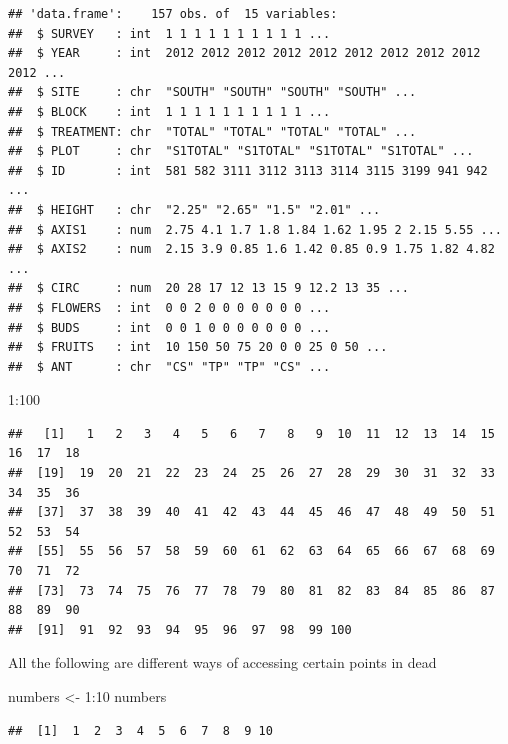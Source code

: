 \documentclass[
]{article}
\newenvironment{Shaded}{\begin{snugshade}}{\end{snugshade}}
\newcommand{\DecValTok}[1]{\textcolor[rgb]{0.00,0.00,0.81}{#1}}
\newcommand{\NormalTok}[1]{#1}
\newcommand{\OtherTok}[1]{\textcolor[rgb]{0.56,0.35,0.01}{#1}}
\newcommand{\SpecialCharTok}[1]{\textcolor[rgb]{0.00,0.00,0.00}{#1}}
\begin{document}
\begin{verbatim}
## 'data.frame':    157 obs. of  15 variables:
##  $ SURVEY   : int  1 1 1 1 1 1 1 1 1 1 ...
##  $ YEAR     : int  2012 2012 2012 2012 2012 2012 2012 2012 2012 2012 ...
##  $ SITE     : chr  "SOUTH" "SOUTH" "SOUTH" "SOUTH" ...
##  $ BLOCK    : int  1 1 1 1 1 1 1 1 1 1 ...
##  $ TREATMENT: chr  "TOTAL" "TOTAL" "TOTAL" "TOTAL" ...
##  $ PLOT     : chr  "S1TOTAL" "S1TOTAL" "S1TOTAL" "S1TOTAL" ...
##  $ ID       : int  581 582 3111 3112 3113 3114 3115 3199 941 942 ...
##  $ HEIGHT   : chr  "2.25" "2.65" "1.5" "2.01" ...
##  $ AXIS1    : num  2.75 4.1 1.7 1.8 1.84 1.62 1.95 2 2.15 5.55 ...
##  $ AXIS2    : num  2.15 3.9 0.85 1.6 1.42 0.85 0.9 1.75 1.82 4.82 ...
##  $ CIRC     : num  20 28 17 12 13 15 9 12.2 13 35 ...
##  $ FLOWERS  : int  0 0 2 0 0 0 0 0 0 0 ...
##  $ BUDS     : int  0 0 1 0 0 0 0 0 0 0 ...
##  $ FRUITS   : int  10 150 50 75 20 0 0 25 0 50 ...
##  $ ANT      : chr  "CS" "TP" "TP" "CS" ...
\end{verbatim}

\begin{Shaded}
\begin{Highlighting}[]
\DecValTok{1}\SpecialCharTok{:}\DecValTok{100}
\end{Highlighting}
\end{Shaded}

\begin{verbatim}
##   [1]   1   2   3   4   5   6   7   8   9  10  11  12  13  14  15  16  17  18
##  [19]  19  20  21  22  23  24  25  26  27  28  29  30  31  32  33  34  35  36
##  [37]  37  38  39  40  41  42  43  44  45  46  47  48  49  50  51  52  53  54
##  [55]  55  56  57  58  59  60  61  62  63  64  65  66  67  68  69  70  71  72
##  [73]  73  74  75  76  77  78  79  80  81  82  83  84  85  86  87  88  89  90
##  [91]  91  92  93  94  95  96  97  98  99 100
\end{verbatim}

All the following are different ways of accessing certain points in dead

\begin{Shaded}
\begin{Highlighting}[]
\NormalTok{numbers }\OtherTok{\textless{}{-}} \DecValTok{1}\SpecialCharTok{:}\DecValTok{10}
\NormalTok{numbers}
\end{Highlighting}
\end{Shaded}

\begin{verbatim}
##  [1]  1  2  3  4  5  6  7  8  9 10
\end{verbatim}
\end{document}
